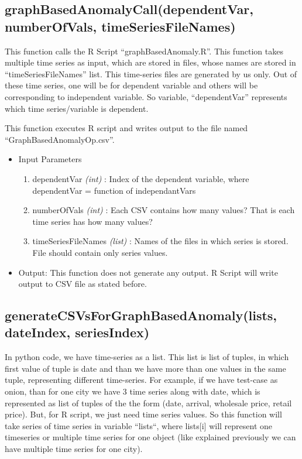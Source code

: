 \subsection{graphBasedAnomalyCall(dependentVar, numberOfVals, 
timeSeriesFileNames)}

This function calls the R Script ``graphBasedAnomaly.R''. This function takes 
multiple time series as input, which are stored in files, whose names are stored 
in ``timeSeriesFileNames'' list. This time-series files are generated by us 
only. Out of these time series, one will be for dependent variable and others 
will be corresponding to independent variable. So variable, ``dependentVar'' 
represents which time series/variable is dependent.

This function executes R script and writes output to the file named 
``GraphBasedAnomalyOp.csv''.

\begin{itemize}
 \item Input Parameters
 
 \begin{enumerate}
  \item dependentVar \textit{(int)} : Index of the dependent variable, where 
dependentVar = function of independantVars
  \item numberOfVals \textit{(int)} : Each CSV contains how many values? That 
is each time series has how many values?
  \item timeSeriesFileNames \textit{(list)} : Names of the files in which series 
is stored. File should contain only series values.

 \end{enumerate}

 \item Output: This function does not generate any output. R Script will write 
output to CSV file as stated before.

 
\end{itemize}


\subsection{generateCSVsForGraphBasedAnomaly(lists, dateIndex, seriesIndex)}

In python code, we have time-series as a list. This list is list of tuples, in 
which first value of tuple is date and than we have more than one values in the 
same tuple, representing different time-series. For example, if we have 
test-case as onion, than for one city we have 3 time series along with date, 
which is represented as list of tuples of the the form (date, arrival, wholesale 
price, retail price). But, for R script, we just need time series values. So 
this function will take series of time series in variable ``lists``, where 
lists[i] will represent one timeseries or multiple time series for one object 
(like explained previously we can have multiple time series for one city).

